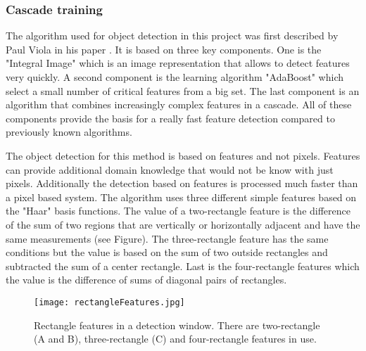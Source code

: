 \subsubsection{Cascade training}
The algorithm used for object detection in this project was first described by Paul Viola in his paper . It is based on three key components. One is the "Integral Image" which is an image representation that allows to detect features very quickly. A second component is the learning algorithm "AdaBoost" which select a small number of critical features from a big set. The last component is an algorithm that combines increasingly complex features in a cascade. All of these components provide the basis for a really fast feature detection compared to previously known algorithms.

The object detection for this method is based on features and not pixels. Features can provide additional domain knowledge that would not be know with just pixels. Additionally the detection based on features is processed much faster than a pixel based system. The algorithm uses three different simple features based on the "Haar" basis functions. The value of a two-rectangle feature is the difference of the sum of two regions that are vertically or horizontally adjacent and have the same measurements (see Figure). The three-rectangle feature has the same conditions but the value is based on the sum of two outside rectangles and subtracted the sum of a center rectangle. Last is the four-rectangle features which the value is the difference of sums of diagonal pairs of rectangles.
\begin{figure}[H]
	\centering
	\texttt{[image: rectangleFeatures.jpg]}
	\caption{Rectangle features in a detection window. There are two-rectangle (A and B), three-rectangle (C) and four-rectangle features in use.}
	\label{fig:rectFeat}
\end{figure}

